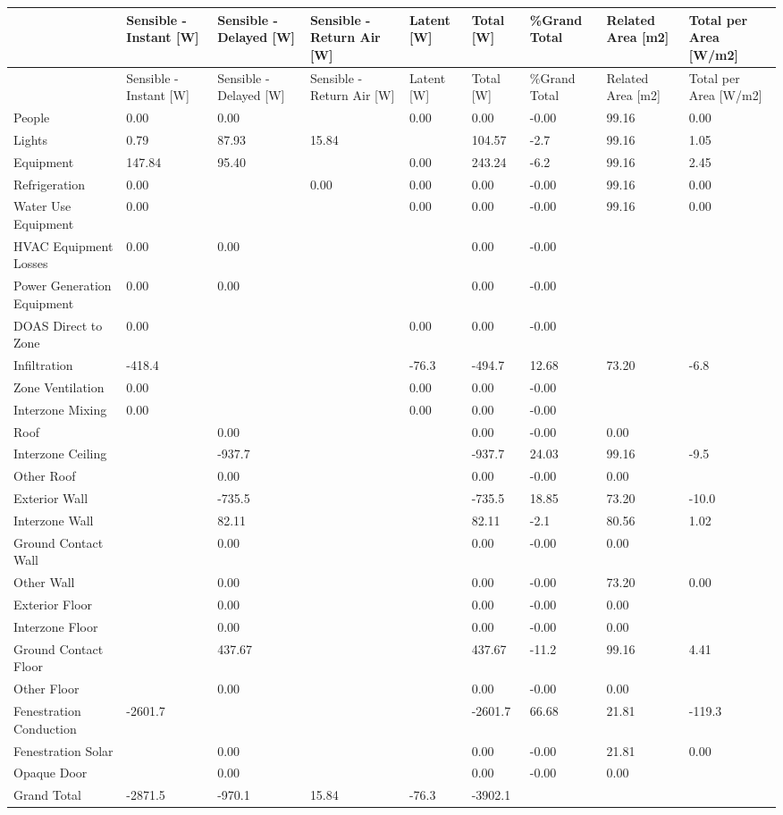 {\scriptsize

\begin{longtable}[c]{>{\raggedright}p{0.65in}>{\raggedright}p{0.65in}>{\raggedright}p{0.65in}>{\raggedright}p{0.65in}>{\raggedright}p{0.65in}>{\raggedright}p{0.65in}>{\raggedright}p{0.65in}>{\raggedright}p{0.65in}>{\raggedright}p{0.65in}}
\toprule
 & Sensible - Instant [W] & Sensible - Delayed [W] & Sensible - Return Air [W] & Latent [W] & Total [W] & \%Grand Total & Related Area {[}m2{]} & Total per Area {[}W/m2{]} \tabularnewline
\midrule
\endfirsthead

\toprule
 & Sensible - Instant [W] & Sensible - Delayed [W] & Sensible - Return Air [W] & Latent [W] & Total [W] & \%Grand Total & Related Area {[}m2{]} & Total per Area {[}W/m2{]} \tabularnewline
\midrule
\endhead

People & 0.00 & 0.00 &  & 0.00 & 0.00 & -0.00 & 99.16 & 0.00 \tabularnewline
Lights & 0.79 & 87.93 & 15.84 &  & 104.57 & -2.7 & 99.16 & 1.05 \tabularnewline
Equipment & 147.84 & 95.40 &  & 0.00 & 243.24 & -6.2 & 99.16 & 2.45 \tabularnewline
Refrigeration & 0.00 &  & 0.00 & 0.00 & 0.00 & -0.00 & 99.16 & 0.00 \tabularnewline
Water Use Equipment & 0.00 &  &  & 0.00 & 0.00 & -0.00 & 99.16 & 0.00 \tabularnewline
HVAC Equipment Losses & 0.00 & 0.00 &  &  & 0.00 & -0.00 &  &  \tabularnewline
Power Generation Equipment & 0.00 & 0.00 &  &  & 0.00 & -0.00 &  &  \tabularnewline
DOAS Direct to Zone & 0.00 &  &  & 0.00 & 0.00 & -0.00 &  &  \tabularnewline
Infiltration & -418.4 &  &  & -76.3 & -494.7 & 12.68 & 73.20 & -6.8 \tabularnewline
Zone Ventilation & 0.00 &  &  & 0.00 & 0.00 & -0.00 &  &  \tabularnewline
Interzone Mixing & 0.00 &  &  & 0.00 & 0.00 & -0.00 &  &  \tabularnewline
Roof &  & 0.00 &  &  & 0.00 & -0.00 & 0.00 &  \tabularnewline
Interzone Ceiling &  & -937.7 &  &  & -937.7 & 24.03 & 99.16 & -9.5 \tabularnewline
Other Roof &  & 0.00 &  &  & 0.00 & -0.00 & 0.00 &  \tabularnewline
Exterior Wall &  & -735.5 &  &  & -735.5 & 18.85 & 73.20 & -10.0 \tabularnewline
Interzone Wall &  & 82.11 &  &  & 82.11 & -2.1 & 80.56 & 1.02 \tabularnewline
Ground Contact Wall &  & 0.00 &  &  & 0.00 & -0.00 & 0.00 &  \tabularnewline
Other Wall &  & 0.00 &  &  & 0.00 & -0.00 & 73.20 & 0.00 \tabularnewline
Exterior Floor &  & 0.00 &  &  & 0.00 & -0.00 & 0.00 &  \tabularnewline
Interzone Floor &  & 0.00 &  &  & 0.00 & -0.00 & 0.00 &  \tabularnewline
Ground Contact Floor &  & 437.67 &  &  & 437.67 & -11.2 & 99.16 & 4.41 \tabularnewline
Other Floor &  & 0.00 &  &  & 0.00 & -0.00 & 0.00 &  \tabularnewline
Fenestration Conduction & -2601.7 &  &  &  & -2601.7 & 66.68 & 21.81 & -119.3 \tabularnewline
Fenestration Solar &  & 0.00 &  &  & 0.00 & -0.00 & 21.81 & 0.00 \tabularnewline
Opaque Door &  & 0.00 &  &  & 0.00 & -0.00 & 0.00 &  \tabularnewline
Grand Total & -2871.5 & -970.1 & 15.84 & -76.3 & -3902.1 &  &  & \tabularnewline

\bottomrule
\end{longtable}}

